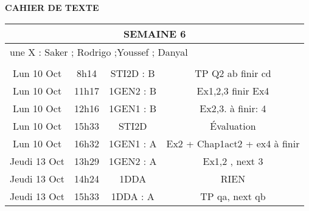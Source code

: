 \documentclass[10pt]{article}
\newcommand{\mypage}[1]{ 
		\begin{minipage}[c]{0.45\textwidth}
			\vspace{5pt}
			{#1}
			\vspace{5pt}
		\end{minipage}
}
\newcommand{\seancea}{\mypage{TP Q2 ab finir cd}}
\newcommand{\seanceb}{\mypage{Ex1,2,3 finir Ex4}}
\newcommand{\seancec}{\mypage{Ex2,3. à finir: 4}}
\newcommand{\seanced}{\mypage{Évaluation}}
\newcommand{\seancee}{\mypage{Ex2 + Chap1act2 + ex4 à finir}}
\newcommand{\seancef}{\mypage{Ex1,2 , next 3}}
\newcommand{\seanceg}{\mypage{RIEN}}
\newcommand{\seanceh}{\mypage{TP qa, next qb}}
\begin{document}
\begin{center}
	\textbf{CAHIER DE TEXTE}
\end{center}

\setlength{\tabcolsep}{13pt}
\renewcommand{\arraystretch}{2.5}
\begin{longtable}{@{}|c|c|c|c|@{}} \toprule
	\midrule\multicolumn{4}{||c||}{SEMAINE 6}                       \\\midrule
	\multicolumn{4}{|l|}{une X : Saker ; Rodrigo ;Youssef ; Danyal} \\\midrule
	\multicolumn{4}{|l|}{}                                          \\\midrule
	Lun 10 Oct   & 8h14  & STI2D : B & \seancea                     \\\midrule
	Lun 10 Oct   & 11h17 & 1GEN2 : B & \seanceb                     \\\midrule
	Lun 10 Oct   & 12h16 & 1GEN1 : B & \seancec                     \\\midrule
	Lun 10 Oct   & 15h33 & STI2D     & \seanced                     \\\midrule
	Lun 10 Oct   & 16h32 & 1GEN1 : A & \seancee                     \\\midrule\midrule
	Jeudi 13 Oct & 13h29 & 1GEN2 : A & \seancef                     \\\midrule
	Jeudi 13 Oct & 14h24 & 1DDA      & \seanceg                     \\\midrule
	Jeudi 13 Oct & 15h33 & 1DDA : A  & \seanceh                     \\


	\bottomrule
\end{longtable}
\end{document}
